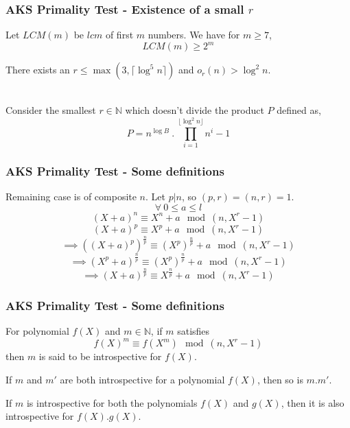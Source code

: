 \documentclass{beamer}
\begin{document}
\begin{frame}
\frametitle{AKS Primality Test - Existence of a small $r$}

\begin{lemma}
\label{lemma:LCMLemma}
Let $LCM(m)$ be $lcm$ of first $m$ numbers. We have for $m \geq 7$,
\[LCM(m) \geq 2^m\]
\end{lemma}

\begin{lemma}
\label{lemma:AKSLemma2}
There exists an $r \leq \max(3, \lceil \log^5 n \rceil)$ and $o_r(n) > \log^2 n$.
\end{lemma}
\ 
\\[3mm]
Consider the smallest $r \in \mathbb{N}$ which doesn't divide the product $P$ defined as,
\[P = n^{\log B}\ .\ \prod_{i=1}^{\lfloor \log^2 n \rfloor}{n^i-1} \]

\end{frame}

\begin{frame}
\frametitle{AKS Primality Test - Some definitions}
Remaining case is of composite $n$. Let $p | n$, so $(p,r) = (n,r) = 1$.
\[\forall\ 0 \leq a \leq l\]
\[(X+a)^n \equiv X^n + a \mod (n, X^r - 1)\]
\[(X+a)^p \equiv X^p + a \mod (n,X^r-1)\]
\[\implies ((X+a)^p)^{\frac{n}{p}} \equiv (X^p)^{\frac{n}{p}} + a \mod (n, X^r - 1)\]
\[\implies (X^p+a)^{\frac{n}{p}} \equiv (X^p)^{\frac{n}{p}} + a \mod (n, X^r - 1)\]
\[\implies (X+a)^{\frac{n}{p}} \equiv X^{\frac{n}{p}} + a \mod (n, X^r - 1)\]
\end{frame}

\begin{frame}
\frametitle{AKS Primality Test - Some definitions}
\begin{definition}
\label{definition:introspective}
For polynomial $f(X)$ and $m \in \mathbb{N}$, if $m$ satisfies
\[f(X)^m \equiv f(X^m) \mod (n,X^r-1)\]
then $m$ is said to be introspective for $f(X)$.
\end{definition}

\begin{lemma}
\label{lemma:IntrospectiveLemma1}
If $m$ and $m'$ are both introspective for a polynomial $f(X)$, then so is $m . m'$.
\end{lemma}

\begin{lemma}
\label{lemma:IntrospectiveLemma2}
If $m$ is introspective for both the polynomials $f(X)$ and $g(X)$, then it is also introspective for $f(X) . g(X)$.
\end{lemma}
\end{frame}
\end{document}
